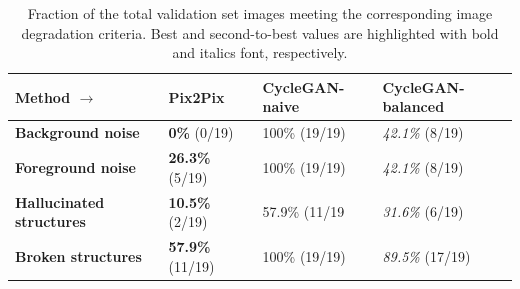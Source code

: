 
\begin{table}[h!]
    \footnotesize
    \centering
    \begin{tabular}{l || lll}
         \textbf{Method} $\rightarrow$     & Pix2Pix                    & CycleGAN-naive  & CycleGAN-balanced          \\
         \hline
         \textbf{Background noise}         & \textbf{0\%} (0/19)        & 100\% (19/19)   & \textit{42.1\%} (8/19)     \\
         \textbf{Foreground noise}         & \textbf{26.3\%} (5/19)     & 100\% (19/19)   & \textit{42.1\%} (8/19)     \\
         \textbf{Hallucinated structures}  & \textbf{10.5\%} (2/19)     & 57.9\% (11/19   & \textit{31.6\%} (6/19)     \\
         \textbf{Broken structures}        & \textbf{57.9\%} (11/19)    & 100\% (19/19)   & \textit{89.5\%} (17/19)    \\
         
    \end{tabular}
    \caption{Fraction of the total validation set images meeting the corresponding image degradation criteria. Best and second-to-best values are highlighted with bold and italics font, respectively.}
    \label{tab:hx4_image_quality_inspection}
\end{table}


